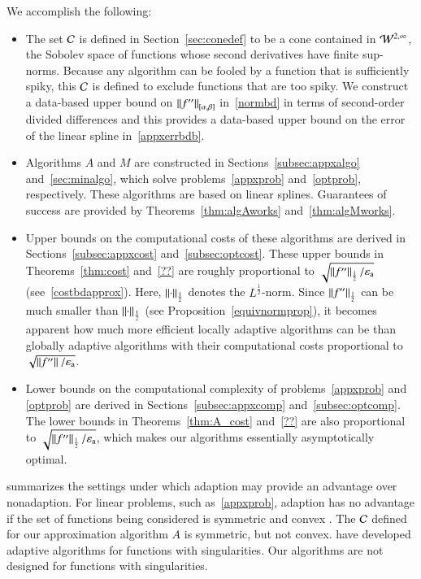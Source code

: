 \documentclass[review]{elsarticle}
\newcommand{\abstol}{\varepsilon_{\textrm{a}}}
\theoremstyle{definition}
\begin{document}
We accomplish the following:
\begin{itemize}

\item The set $\cc$ is defined in Section~\ref{sec:conedef} to be a cone contained in $\cw^{2,\infty}$, the Sobolev space of functions whose second derivatives have finite sup-norms.  Because any algorithm can be fooled by a function that is sufficiently spiky, this $\cc$ is defined to exclude functions that are too spiky.  We construct a data-based upper bound on $\norm[{[\alpha,\beta]}]{f''}$ in~\eqref{normbd} in terms of second-order divided differences and this provides a data-based upper bound on the error of the linear spline in~\eqref{appxerrbdb}.

\item Algorithms $A$ and $M$ are constructed in Sections~\ref{subsec:appxalgo} and~\ref{sec:minalgo}, which solve problems~\eqref{appxprob}
and~\eqref{optprob}, respectively.  These algorithms are based on linear splines.  Guarantees of success are provided by Theorems~\ref{thm:algAworks}
and~\ref{thm:algMworks}.

\item Upper bounds on the computational costs of these algorithms  are derived in Sections~\ref{subsec:appxcost} and~\ref{subsec:optcost}.  These upper bounds in Theorems~\ref{thm:cost} and~\ref{??} are roughly proportional to $\sqrt{\norm[\frac12]{f''}/\abstol}$ (see~\eqref{costbdapprox}).  Here, $\norm[\frac12]{\cdot}$ denotes the $L^{\frac12}$-norm.  Since $\norm[\frac12]{f''}$ can be much smaller than $\norm[\frac12]{\cdot}$ (see
Proposition~\ref{equivnormprop}), it becomes apparent how much more efficient locally adaptive algorithms can be than globally adaptive algorithms with their computational costs  proportional to $\sqrt{\norm{f''}/\abstol}$.

\item Lower bounds on the computational complexity of problems~\eqref{appxprob} and \eqref{optprob} are derived in Sections~\ref{subsec:appxcomp}
and~\ref{subsec:optcomp}.  The lower bounds in Theorems~\ref{thm:A_cost} and~\ref{??} are also proportional to $\sqrt{\norm[\frac12]{f''}/\abstol}$, which makes our algorithms essentially asymptotically optimal.

\end{itemize}

\cite{Nov96a} summarizes the settings under which adaption may provide an advantage over nonadaption.  For linear problems, such as~\eqref{appxprob}, adaption has no advantage if the set of functions being considered is symmetric and convex \cite[Chapter 4, Theorem 5.2.1]{TraWasWoz88} \cite[Theorem 1]{Nov96a}.  The $\cc$ defined for our approximation algorithm $A$ is symmetric, but not convex.  \cite{PlaEtal08a} have developed adaptive algorithms for functions with singularities.  Our algorithms are not designed for functions with singularities.
\end{document}
